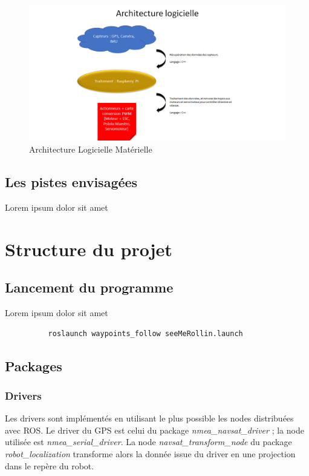 \documentclass[12pt, openany]{report}
\begin{document}
      \begin{figure}[H]
      \begin{center}
        \hfill \includegraphics[scale=0.6]{img/Architecture_Logicielle_Materielle.png} \hspace*{\fill}
        \caption{Architecture Logicielle Matérielle}
      \end{center}
      \end{figure}


\subsection{Les pistes envisagées}
Lorem ipsum dolor sit amet

\section{Structure du projet}
\subsection{Lancement du programme}
Lorem ipsum dolor sit amet

\begin{lstlisting}
          roslaunch waypoints_follow seeMeRollin.launch
    \end{lstlisting}

\subsection{Packages}
\subsubsection{Drivers}
Les drivers sont implémentés en utilisant le plus possible les nodes distribuées avec ROS. Le driver du GPS est celui du package \emph{nmea\_navsat\_driver} ;
la node utilisée est \emph{nmea\_serial\_driver}. La node \emph{navsat\_transform\_node} du package \emph{robot\_localization} transforme alors la donnée
issue du driver en une projection dans le repère du robot.
\end{document}
